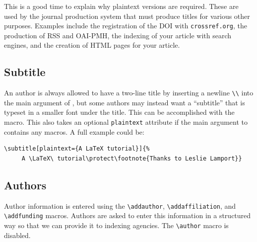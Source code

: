 \documentclass[journal=cic,version=preprint]{iacrj}
\begin{document}
This is a good time to explain why plaintext versions are
required. These are used by the journal production system that must
produce titles for various other purposes. Examples include the
registration of the DOI with \texttt{crossref.org}, the production of
RSS and OAI-PMH, the indexing of your article with search engines, and
the creation of HTML pages for your article.

\subsection{Subtitle}
An author is always allowed to have a two-line title by inserting a
newline \texttt{\textbackslash\textbackslash} into the main argument
of , but some authors may instead want a ``subtitle''
that is typeset in a smaller font under the title.
This can be accomplished with the  macro.
This also takes an optional \texttt{plaintext} attribute if the main argument
to  contains any macros.  A full example could be:
\begin{Verbatim}[samepage=true]
\subtitle[plaintext={A LaTeX tutorial}]{%
     A \LaTeX\ tutorial\protect\footnote{Thanks to Leslie Lamport}}
\end{Verbatim}

\subsection{Authors}
Author information is entered using the \verb+\addauthor+,
\verb+\addaffiliation+, and \verb+\addfunding+ macros. Authors are asked
to enter this information in a structured way so that we can provide
it to indexing agencies. The \verb+\author+ macro is disabled.
\end{document}
